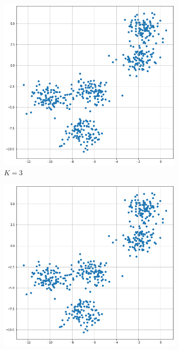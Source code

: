 \documentclass[12pt]{article}
\begin{document}
\begin{enumerate}
\begin{figure}[!h]
\begin{subfigure}[b]{0.25\textwidth}
         \includegraphics[width=\textwidth]{fig/hw2_q1.png}
         \caption{$K=3$}
         \label{fig:K3}
     \end{subfigure}
     \begin{subfigure}[b]{0.25\textwidth}
         \centering
         \includegraphics[width=\textwidth]{fig/hw2_q1.png}

\end{subfigure}
\end{figure}
\end{enumerate}
\end{document}
